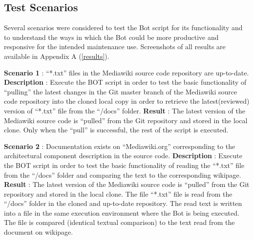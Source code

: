 \subsection{Test Scenarios}
Several scenarios were considered to test the Bot script for its functionality and to understand the ways in which the Bot could be more productive and responsive for the intended maintenance use. Screenshots of all results are available in Appendix A (\autoref{results}).
\begin{mdframed}[leftmargin=10pt,rightmargin=10pt]
\textbf{Scenario 1} : \enquote{*.txt} files in the Mediawiki source code repository are up-to-date.
\newline
\newline \textbf{Description} : Execute the BOT script in order to test the basic functionality of \enquote{pulling} the latest changes in the Git master branch of the Mediawiki source code repository into the cloned local copy in order to retrieve the latest(reviewed) version of \enquote{*.txt} file from the \enquote{/docs} folder.
\newline 
\newline \textbf{Result} : The latest version of the Mediawiki source code is \enquote{pulled} from the Git repository and stored in the local clone. Only when the \enquote{pull} is successful, the rest of the script is executed.
\end{mdframed}
\begin{mdframed}[leftmargin=10pt,rightmargin=10pt]
\textbf{Scenario 2} : Documentation exists on \enquote{Mediawiki.org} corresponding to the architectural component description in the source code.
\newline
\newline \textbf{Description} : Execute the BOT script in order to test the basic functionality of reading the \enquote{*.txt} file from the \enquote{/docs} folder and comparing the text to the corresponding wikipage.
\newline 
\newline \textbf{Result} : The latest version of the Mediawiki source code is \enquote{pulled} from the Git repository and stored in the local clone. The file \enquote{*.txt} file is read from the \enquote{/docs} folder in the cloned and up-to-date repository. The read text is written into a file in the same execution environment where the Bot is being executed. The file is compared (identical textual comparison) to the text read from the document on wikipage.
\end{mdframed}
